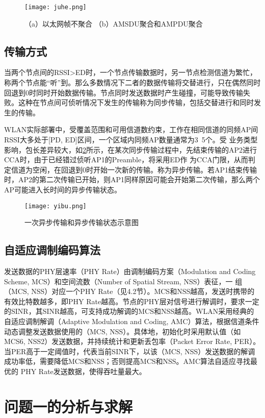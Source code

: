 \documentclass[bwprint]{gmcmthesis}
\begin{document}
\begin{figure}[!htbp]
    \centering
    \texttt{[image: juhe.png]}
    \caption{\centering （a）以太网帧不聚合  （b）AMSDU聚合和AMPDU聚合}
    \label{pho:juhe}
\end{figure}
\subsection{传输方式}
当两个节点间的RSSI>ED时，一个节点传输数据时，另一节点检测信道为繁忙，称两个节点能“听”到。那么多数情况下二者的数据传输将交替进行，只在偶然同时回退到0时同时开始数据传输。节点同时发送数据时产生碰撞，可能导致传输失败。这种在节点间可侦听情况下发生的传输称为同步传输，包括交替进行和同时发生的传输。

WLAN实际部署中，受覆盖范围和可用信道数约束，工作在相同信道的同频AP间RSSI大多处于[PD, ED]区间，一个区域内同频AP数量通常为3~5个。受
业务类型影响，包长差异较大，如\ref{pho:yibu}所示，在某次同步传输过程中，先结束传输的AP2进行CCA时，由于已经错过侦听AP1的Preamble，将采用ED作
为CCA门限，从而判定信道为空闲，在回退到0时开始一次新的传输。称为异步传输。若AP1结束传输时，AP2的第二次传输已开始，则AP1同样原因可能会开始第二次传输，那么两个AP可能进入长时间的异步传输状态。

\begin{figure}[!htbp]
    \centering
    \texttt{[image: yibu.png]}
    \caption{\centering 一次异步传输和异步传输状态示意图}
    \label{pho:yibu}
\end{figure}
\subsection{自适应调制编码算法}
发送数据的PHY层速率（PHY Rate）由调制编码方案（Modulation and Coding Scheme, MCS）和空间流数（Number of Spatial Stream, NSS）表征，一
组（MCS, NSS）对应一个PHY Rate（见4.2节）。MCS和NSS越高，发送时携带的有效比特数越多，即PHY Rate越高。节点的PHY层对信号进行解调时，要求一定
的SINR，其SINR越高，可支持成功解调的MCS和NSS越高。WLAN采用经典的自适应调制解调（Adaptive Modulation and Coding, AMC）算法，根据信道条件
动态调整发送数据使用的（MCS, NSS）。具体地，初始化时采用默认值（如MCS6, NSS2）发送数据，并持续统计和更新丢包率（Packet Error Rate, PER）。
当PER高于一定阈值时，代表当前SINR下，以该（MCS, NSS）发送数据的解调成功率低，需要降低MCS和NSS；否则提高MCS和NSS。AMC算法自适应寻找最优的
PHY Rate发送数据，使得吞吐量最大。
\newpage
\section{问题一的分析与求解}
\end{document}
